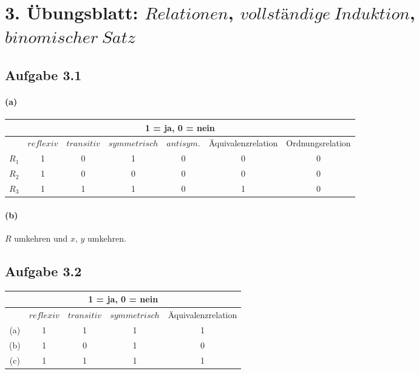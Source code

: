 \section{3. Übungsblatt: $Relationen$, $vollständige\ Induktion$, $binomischer\ Satz$}

\subsection{Aufgabe 3.1}

\paragraph{(a)}
\begin{center}
\begin{tabular}{||c||c|c|c|c||c|c||}
\hline
\multicolumn{7}{||c||}{1 = ja, 0 = nein}\\
\hline
\hline
 & $reflexiv$ & $transitiv$ & $symmetrisch$ & $antisym.$ & Äquivalenzrelation & Ordnungsrelation \\
\hline
\hline
 $R_1$ & 1 & 0 & 1 & 0 & 0 & 0 \\
 $R_2$ & 1 & 0 & 0 & 0 & 0 & 0 \\
 $R_3$ & 1 & 1 & 1 & 0 & 1 & 0 \\
\hline
\end{tabular}
\end{center}

\paragraph{(b)}
$R$ umkehren und $x$, $y$ umkehren.

\newpage

\subsection{Aufgabe 3.2}
\begin{center}
\begin{tabular}{||c||c|c|c||c||}
\hline
\multicolumn{5}{||c||}{1 = ja, 0 = nein}\\
\hline
\hline
 & $reflexiv$ & $transitiv$ & $symmetrisch$ & Äquivalenzrelation \\
\hline
\hline
 (a) & 1 & 1 & 1 & 1 \\
 (b) & 1 & 0 & 1 & 0 \\
 (c) & 1 & 1 & 1 & 1 \\
\hline
\end{tabular}
\end{center}

